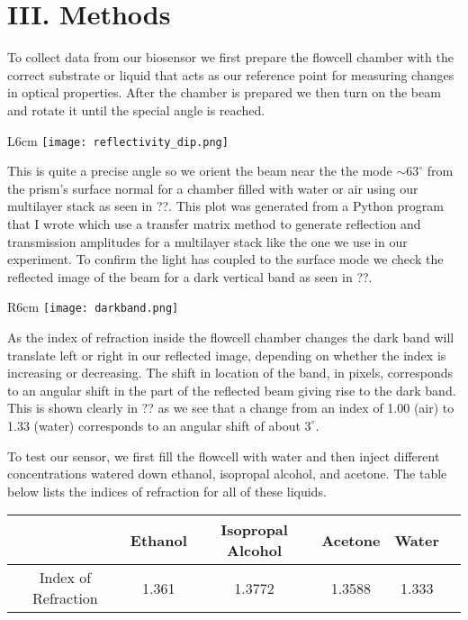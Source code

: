 \section*{III. Methods}
\hspace{0.25in}
To collect data from our biosensor we first prepare the flowcell chamber with the correct substrate or liquid that acts as our reference point for measuring changes in optical properties. After the chamber is prepared we then turn on the beam and rotate it until the special angle is reached. 

\begin{wrapfigure}{L}{6cm}
    \texttt{[image: reflectivity\_dip.png]}
\end{wrapfigure}

This is quite a precise angle so we orient the beam near the the mode $\sim 63^{\circ}$ from the prism's surface normal for a chamber filled with water or air using our multilayer stack as seen in ??. This plot was generated from a Python program that I wrote which use a transfer matrix method to generate reflection and transmission amplitudes for a multilayer stack like the one we use in our experiment. To confirm the light has coupled to the surface mode we check the reflected image of the beam for a dark vertical band as seen in ??.

\begin{wrapfigure}{R}{6cm}
	\texttt{[image: darkband.png]}
\end{wrapfigure}

As the index of refraction inside the flowcell chamber changes the dark band will translate left or right in our reflected image, depending on whether the index is increasing or decreasing. The shift in location of the band, in pixels, corresponds to an angular shift in the part of the reflected beam giving rise to the dark band. This is shown clearly in ?? as we see that a change from an index of 1.00 (air) to 1.33 (water) corresponds to an angular shift  of about $3^\circ$.


To test our sensor, we first fill the flowcell with water and then inject different concentrations watered down ethanol, isopropal alcohol, and acetone. The table below lists the indices of refraction for all of these liquids.
\begin{center}
\begin{tabular}{| c | c c c c c |}
	\hline
    {}      			& Ethanol & Isopropal Alcohol & Acetone & Water \\
	\hline
	Index of Refraction & 1.361   & 1.3772            & 1.3588  & 1.333 \\
    \hline
\end{tabular}
\end{center}
